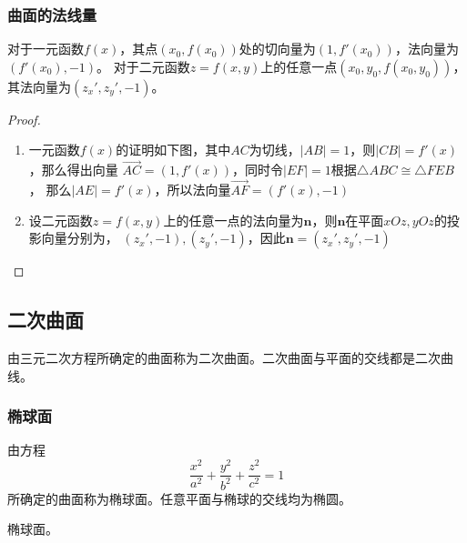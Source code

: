 \subsubsection{曲面的法线量}
对于一元函数$f(x)$，其点$(x_0,f(x_0))$处的切向量为$(1,f'(x_0))$，法向量为$(f'(x_0),-1)$。
对于二元函数$z=f(x,y)$上的任意一点$(x_0,y_0,f(x_0,y_0))$，其法向量为$(z_x',z_y',-1)$。
\begin{marginfigure}
    \centering
\end{marginfigure}

\begin{proof}
    \begin{enumerate}[(1)]
        \item 一元函数$f(x)$的证明如下图，其中$AC$为切线，$|AB|=1$，则$|CB|=f'(x)$，那么得出向量
              $\overrightarrow{AC}=(1,f'(x))$，同时令$|EF|=1$根据$\triangle ABC \cong\triangle FEB$，
              那么$|AE|=f'(x)$，所以法向量$\overrightarrow{AF}=(f'(x),-1)$

        \item 设二元函数$z=f(x,y)$上的任意一点的法向量为$\bm{n}$，则$\bm{n}$在平面$xOz, yOz$的投影向量分别为，
              $(z_x',-1),(z_y',-1)$，因此$\bm{n} = (z_x',z_y',-1)$
    \end{enumerate}
\end{proof}

\subsection{二次曲面}
由三元二次方程所确定的曲面称为二次曲面。二次曲面与平面的交线都是二次曲线。

\subsubsection{椭球面}
由方程
\begin{equation}
    \frac{x^2}{a^2} + \frac{y^2}{b^2} + \frac{z^2}{c^2} = 1
\end{equation}
所确定的曲面称为椭球面。任意平面与椭球的交线均为椭圆。
\begin{marginfigure}
    \centering
    \caption{椭球面。}
\end{marginfigure}

